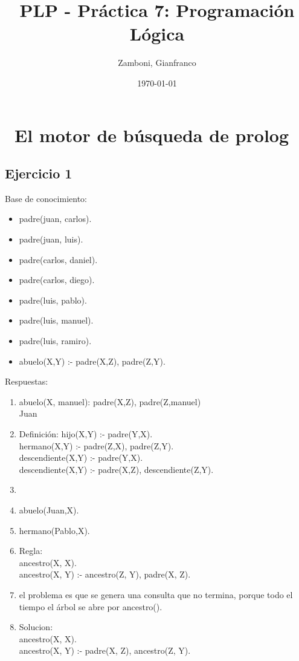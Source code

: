 \documentclass[10pt,a4paper]{article}
\begin{document}
  \title{PLP - Práctica 7: Programación Lógica}

  \date{\today}

  \author{Zamboni, Gianfranco}

  \maketitle
  \setcounter{page}{1}


\section*{\ El motor de búsqueda de prolog}

\subsection{Ejercicio 1}
Base de conocimiento:
\begin{multicols}{2}
    \begin{itemize}
        \item padre(juan, carlos).
        \item padre(juan, luis).
        \item padre(carlos, daniel).
        \item padre(carlos, diego).
	    	\columnbreak
        \item padre(luis, pablo).
        \item padre(luis, manuel).
        \item padre(luis, ramiro).
        \item abuelo(X,Y) :- padre(X,Z), padre(Z,Y).
    \end{itemize}
\end{multicols}
Respuestas:
\begin{enumerate}
\item abuelo(X, manuel): padre(X,Z), padre(Z,manuel) \\
Juan
\item Definición:
hijo(X,Y) :- padre(Y,X). \\
hermano(X,Y) :- padre(Z,X), padre(Z,Y). \\
descendiente(X,Y) :- padre(Y,X). \\
descendiente(X,Y) :- padre(X,Z), descendiente(Z,Y).
\item {}
\item abuelo(Juan,X).
\item hermano(Pablo,X).
\item Regla: \\
ancestro(X, X). \\
ancestro(X, Y) :- ancestro(Z, Y), padre(X, Z).
\item el problema es que se genera una consulta que no termina, porque todo el tiempo el árbol se abre por ancestro().
\item Solucion: \\
ancestro(X, X). \\
ancestro(X, Y) :- padre(X, Z), ancestro(Z, Y).
\end{enumerate}
\end{document}
